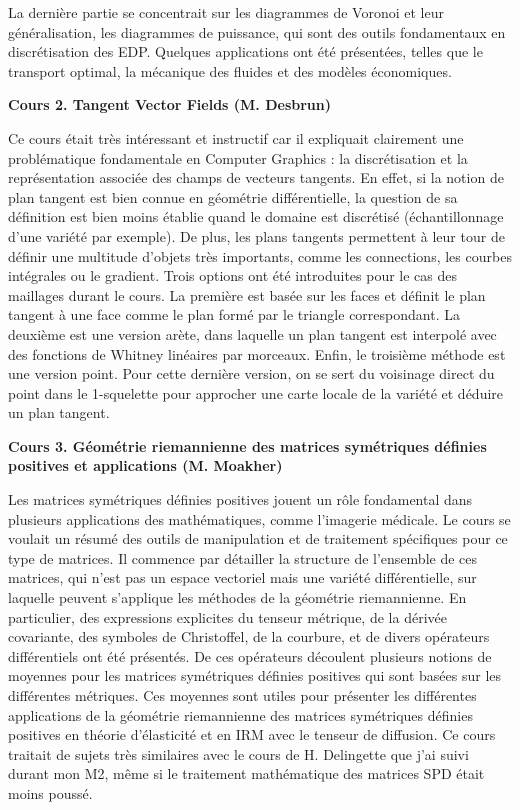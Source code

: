 \documentclass[a4paper, 11pt]{article}
\begin{document}
La dernière partie se concentrait sur
les diagrammes de Voronoi et leur généralisation, les diagrammes de puissance, qui sont des outils fondamentaux en discrétisation des EDP.
Quelques applications ont été présentées, telles que le transport optimal, la mécanique des fluides et des modèles économiques.



\begin{center} \textbf{Cours 2. Tangent Vector Fields (M. Desbrun)} \end{center}

Ce cours était très intéressant et instructif car il expliquait clairement une problématique fondamentale en Computer Graphics : la discrétisation et la représentation associée des champs de vecteurs tangents. En effet, si la notion de plan tangent est bien connue en géométrie différentielle, la question de sa définition est bien moins établie quand le domaine est discrétisé (échantillonnage d'une variété par exemple). De plus, les plans tangents permettent à leur tour de définir une multitude d'objets très importants, comme les connections, les courbes intégrales ou le gradient. Trois options ont été introduites pour le cas des maillages durant le cours. La première est basée sur les faces et définit le plan tangent à une face comme le plan formé par le triangle correspondant. La deuxième est une version arète, dans laquelle un plan tangent est interpolé avec des fonctions de Whitney linéaires par morceaux. Enfin, le troisième méthode est une version point. Pour cette dernière version, on se sert du voisinage direct du point dans le 1-squelette pour approcher une carte locale de la variété et déduire un plan tangent.

\newpage

\begin{center} \textbf{Cours 3. Géométrie riemannienne des matrices symétriques définies positives et applications (M. Moakher)} \end{center}

Les matrices symétriques définies positives jouent un rôle fondamental dans plusieurs applications des mathématiques, comme l'imagerie médicale. Le cours se voulait un résumé des outils de manipulation et de traitement spécifiques pour ce type de matrices. Il commence par détailler la structure de l'ensemble de ces matrices, qui n’est pas un espace vectoriel mais une variété différentielle, sur laquelle peuvent s'applique les méthodes de la géométrie riemannienne.
En particulier, des expressions explicites du tenseur métrique, de la dérivée covariante, des symboles de Christoffel, de la courbure, et de divers opérateurs différentiels ont été présentés. De ces opérateurs découlent plusieurs notions de moyennes pour les matrices symétriques définies positives qui sont basées sur les différentes métriques.
Ces moyennes sont utiles pour présenter les différentes applications de la géométrie riemannienne des matrices symétriques définies positives en théorie d’élasticité et en IRM avec le tenseur de diffusion.
Ce cours traitait de sujets très similaires avec le cours de H. Delingette que j'ai suivi durant mon M2, même si le traitement mathématique des matrices SPD était moins poussé.
\end{document}
